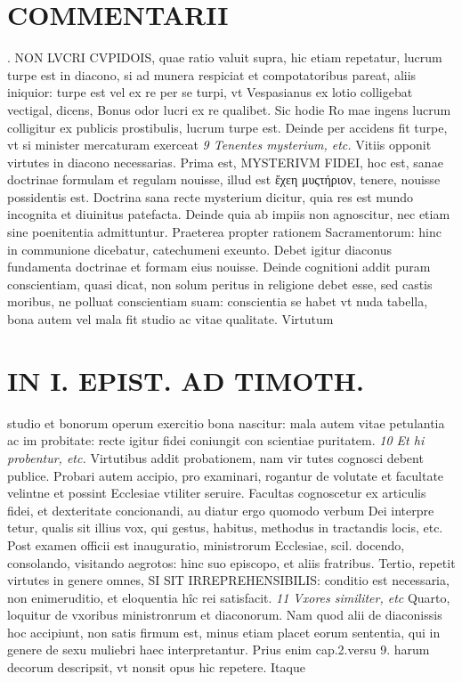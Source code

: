 \documentclass{article}
\begin{document}
\begin{pages}
\section*{COMMENTARII }
\marginpar{[ p.72 ]}. NON LVCRI CVPIDOIS, quae ratio valuit supra, hic etiam repetatur, lucrum turpe est in diacono, si ad munera respiciat et compotatoribus pareat, aliis iniquior: turpe est vel ex re per se turpi, vt Vespasianus ex lotio colligebat vectigal, dicens, Bonus odor lucri ex re qualibet. Sic hodie Ro mae ingens lucrum colligitur ex publicis prostibulis, lucrum turpe est. Deinde per accidens fit turpe, vt si minister mercaturam exerceat  \pend
\textit{9 Tenentes mysterium, etc. }\pstart Vitiis opponit virtutes in diacono necessarias. Prima est, MYSTERIVM FIDEI, hoc est, sanae doctrinae formulam et regulam nouisse, illud est ἔχεη μυςτήριον, tenere, nouisse possidentis est. Doctrina sana recte mysterium dicitur, quia res est mundo incognita et diuinitus patefacta. Deinde quia ab impiis non agnoscitur, nec etiam sine poenitentia admittuntur. Praeterea propter rationem Sacramentorum: hinc in communione dicebatur, catechumeni exeunto. Debet igitur diaconus fundamenta doctrinae et formam eius nouisse. Deinde cognitioni addit puram conscientiam, quasi dicat, non solum peritus in religione debet esse, sed castis moribus, ne polluat conscientiam suam: conscientia se habet vt nuda tabella, bona autem vel mala fit studio ac vitae qualitate. Virtutum  \pend
\section*{IN I. EPIST. AD TIMOTH. }
\marginpar{[ p.73 ]}\pstart studio et bonorum operum exercitio bona nascitur: mala autem vitae petulantia ac im probitate: recte igitur fidei coniungit con scientiae puritatem.  \pend
\textit{10 Et hi probentur, etc. }\pstart Virtutibus addit probationem, nam vir tutes cognosci debent publice. Probari autem accipio, pro examinari, rogantur de volutate et facultate velintne et possint Ecclesiae vtiliter seruire. Facultas cognoscetur ex articulis fidei, et dexteritate concionandi, au diatur ergo quomodo verbum Dei interpre tetur, qualis sit illius vox, qui gestus, habitus, methodus in tractandis locis, etc.  \pend\pstart Post examen officii est inauguratio, ministrorum Ecclesiae, scil. docendo, consolando, visitando aegrotos: hinc suo episcopo, et aliis fratribus. Tertio, repetit virtutes in genere omnes, SI SIT IRREPREHENSIBILIS: conditio est necessaria, non enimeruditio, et eloquentia hîc rei satisfacit.  \pend
\textit{11 Vxores similiter, etc }\pstart Quarto, loquitur de vxoribus ministronrum et diaconorum. Nam quod alii de diaconissis hoc accipiunt, non satis firmum est, minus etiam placet eorum sententia, qui in genere de sexu muliebri haec interpretantur. Prius enim cap.2.versu 9. harum decorum descripsit, vt nonsit opus hic repetere. Itaque  \pend

\end{pages}
\end{document}
